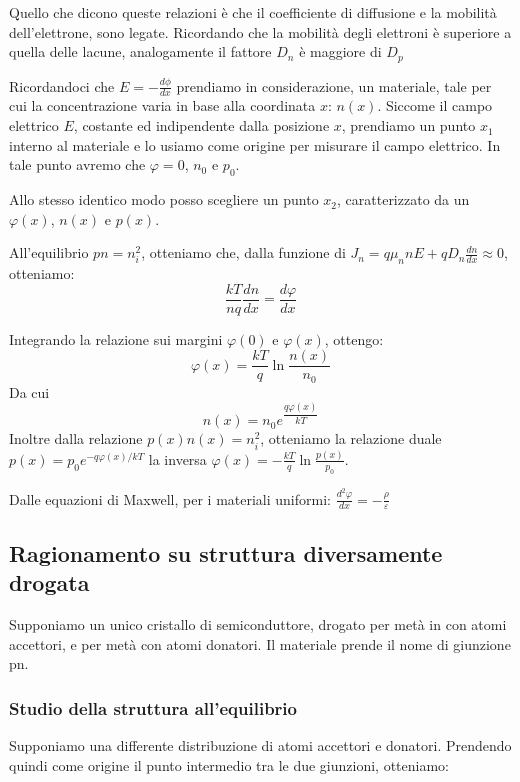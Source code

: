 \documentclass[../template]{subfiles}
\begin{document}
Quello che dicono queste relazioni è che il coefficiente di diffusione e la mobilità dell'elettrone, sono legate.
Ricordando che la mobilità degli elettroni è superiore a quella delle lacune, analogamente il fattore $D_n$ è maggiore di $D_p$

Ricordandoci che $E = -\frac{d\phi}{dx}$
prendiamo in considerazione, un materiale, tale per cui la concentrazione varia in base alla coordinata $x$: $n(x)$.
Siccome il campo elettrico $E$, costante ed indipendente dalla posizione $x$, prendiamo un punto $x_1$ interno al materiale e lo usiamo come origine per misurare il campo elettrico. In tale punto avremo che $\varphi = 0$, $n_0$ e $p_0$.

Allo stesso identico modo posso scegliere un punto $x_2$, caratterizzato da un $\varphi(x)$, $n(x)$ e $p(x)$.

All'equilibrio $pn = n_i^2$, otteniamo che, dalla funzione di $J_n = q \mu_n  n E + q D_n \frac{dn}{dx} \approx 0$, otteniamo:
\[
    \frac{kT}{nq} \frac{dn}{dx} = \frac{d\varphi}{dx}
\]

Integrando la relazione sui margini $\varphi(0)$ e $\varphi(x)$, ottengo:
\[
    \varphi(x) = \frac{kT}{q} \ln \frac{n(x)}{n_0}
\]
Da cui
\[
    n(x) = n_0 e^{\dfrac{q\varphi(x)}{kT}}
\]
Inoltre dalla relazione $p(x) n(x) = n_i^2$, otteniamo la relazione duale $p(x) = p_0 e^{-q\varphi(x) / kT}$ la inversa $\varphi(x) = - \frac{kT}{q} \ln \frac{p(x)}{p_0}$.

Dalle equazioni di Maxwell, per i materiali uniformi: $\frac{d^2 \varphi}{dx} = -\frac{\rho}{\varepsilon}$
\subsection{Ragionamento su struttura diversamente drogata}
Supponiamo un unico cristallo di semiconduttore, drogato per metà in con atomi accettori, e per metà con atomi donatori.
Il materiale prende il nome di giunzione pn.


\subsubsection{Studio della struttura all'equilibrio}

Supponiamo una differente distribuzione di atomi accettori e donatori. Prendendo quindi come origine il punto intermedio tra le due giunzioni, otteniamo:

\begin{figure}[h]
    \centering
\end{figure}
\end{document}
